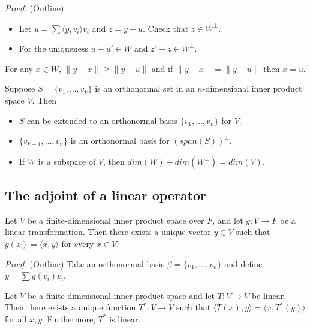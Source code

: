 \documentclass[12pt]{article}
\newenvironment{theorem}[2][Theorem]{\begin{trivlist}
\item[\hskip \labelsep {\bfseries #1}\hskip \labelsep {\bfseries #2.}]}{\end{trivlist}}
\newenvironment{corollary}[2][Corollary]{\begin{trivlist}
\item[\hskip \labelsep {\bfseries #1}\hskip \labelsep {\bfseries #2}]}{\end{trivlist}}
\begin{document}
\textit{Proof.} (Outline)

\begin{itemize}
    \item Let $u = \sum \langle y, v_i \rangle v_i$ and $z = y - u$. Check that $z \in W^\perp$.
    
    \item For the uniqueness $u - u' \in W$ and $z' - z \in W^\perp$.
\end{itemize}

\begin{corollary}{9}
For any $x \in W$, $\lVert y - x \rVert \geq \lVert y - u \rVert$ and if $\lVert y - x \rVert = \lVert y - u \rVert$ then $x = u$.
\end{corollary}

\begin{theorem}{6.7}
Suppose $S = \{v_1, \dots, v_k\}$ is an orthonormal set in an $n$-dimensional inner product space $V$. Then 

\begin{itemize}
    \item[(a)] $S$ can be extended to an orthonormal basis $\{v_1, \dots, v_n\}$ for $V$.
    
    \item[(b)] $\{v_{k+1}, \dots, v_n\}$ is an orthonormal basis for $(span(S))^\perp$.
    
    \item[(c)] If $W$ is a subspace of $V$, then $dim(W) + dim(W^\perp) = dim(V)$.
\end{itemize}
\end{theorem}

\subsection{The adjoint of a linear operator}

\begin{theorem}{6.8}
Let $V$ be a finite-dimensional inner product space over $F$, and let $g : V \to F$ be a linear transformation. Then there exists a unique vector $y \in V$ such that $g(x) = \langle x, y \rangle$ for every $x \in V$.
\end{theorem}

\textit{Proof.} (Outline) Take an orthonormal basis $\beta = \{v_1, \dots, v_n\}$ and define $y = \sum \overline{g(v_i)}v_i$.

\begin{theorem}{6.9}
Let $V$ be a finite-dimensional inner product space and let $T : V \to V$ be linear. Then there exists a unique function $T^* : V \to V$ such that $\langle T(x), y \rangle = \langle x, T^*(y) \rangle$ for all $x,y$. Furthermore, $T^*$ is linear.
\end{theorem}
\end{document}
